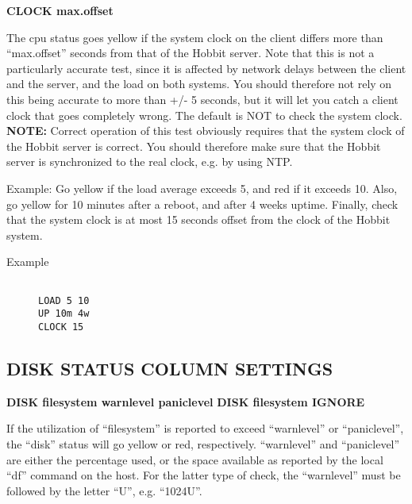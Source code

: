  


 \textbf{CLOCK max.offset}



  The cpu status goes yellow if the system clock on the client differs more than ``max.offset'' seconds from that of the Hobbit server. Note that this is not a particularly accurate test, since it is affected by network delays between the client and the server, and the load on both systems. You should therefore not rely on this being accurate to more than +/- 5 seconds, but it will let you catch a client clock that goes completely wrong. The default is NOT to check the system clock.  
\textbf{NOTE:}
 Correct operation of this test obviously requires that the system clock of the Hobbit server is correct. You should therefore make sure that the Hobbit server is synchronized to the real clock, e.g. by using NTP. 


 


  Example: Go yellow if the load average exceeds 5, and red if it exceeds 10. Also, go yellow for 10 minutes after a reboot, and after 4 weeks uptime. Finally, check that the system clock is at most 15 seconds offset from the clock of the Hobbit system. \begin{description}
\item[Example]

\begin{verbatim}

LOAD 5 10
UP 10m 4w
CLOCK 15

\end{verbatim}


\end{description}



 


 
\subsection{DISK STATUS COLUMN SETTINGS}


 \textbf{DISK filesystem warnlevel paniclevel}
 \textbf{DISK filesystem IGNORE}



  If the utilization of ``filesystem'' is reported to exceed ``warnlevel'' or ``paniclevel'', the ``disk'' status will go yellow or red, respectively. ``warnlevel'' and ``paniclevel'' are either the percentage used, or the space available as reported by the local ``df'' command on the host. For the latter type of check, the ``warnlevel'' must be followed by the letter ``U'', e.g. ``1024U''. 


